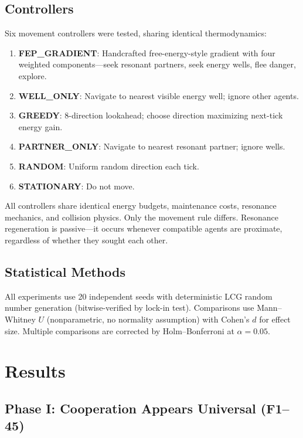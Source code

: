 \documentclass[12pt,a4paper]{article}
\begin{document}
\subsection{Controllers}

Six movement controllers were tested, sharing identical thermodynamics:

\begin{enumerate}
\item \textbf{FEP\_GRADIENT}: Handcrafted free-energy-style gradient with four weighted components---seek resonant partners, seek energy wells, flee danger, explore.
\item \textbf{WELL\_ONLY}: Navigate to nearest visible energy well; ignore other agents.
\item \textbf{GREEDY}: 8-direction lookahead; choose direction maximizing next-tick energy gain.
\item \textbf{PARTNER\_ONLY}: Navigate to nearest resonant partner; ignore wells.
\item \textbf{RANDOM}: Uniform random direction each tick.
\item \textbf{STATIONARY}: Do not move.
\end{enumerate}

All controllers share identical energy budgets, maintenance costs, resonance mechanics, and collision physics. Only the movement rule differs. Resonance regeneration is passive---it occurs whenever compatible agents are proximate, regardless of whether they sought each other.

\subsection{Statistical Methods}

All experiments use 20 independent seeds with deterministic LCG random number generation (bitwise-verified by lock-in test). Comparisons use Mann--Whitney $U$ (nonparametric, no normality assumption) with Cohen's $d$ for effect size. Multiple comparisons are corrected by Holm--Bonferroni at $\alpha = 0.05$.

\section{Results}

\subsection{Phase I: Cooperation Appears Universal (F1--45)}
\end{document}
